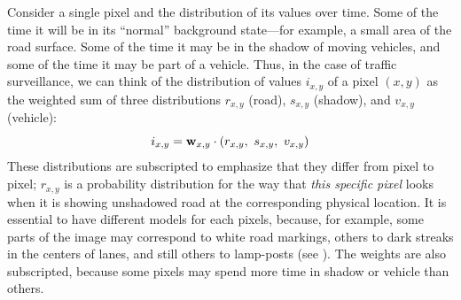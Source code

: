 Consider a single pixel and the distribution of its values over time.
Some of the time it will be in its ``normal'' background state---for
example, a small area of the road surface. Some of the time it may be
in the shadow of moving vehicles, and some of the time it may be part
of a vehicle. Thus, in the case of traffic surveillance, we can think
of the distribution of values $i_{x,y}$ of a pixel $(x,y)$ as the
weighted sum of three distributions $r_{x,y}$ (road), $s_{x,y}$
(shadow), and $v_{x,y}$ (vehicle):
\[ i_{x,y} = \mbox{{\bf w}}_{x,y} \cdot (r_{x,y},\ s_{x,y},\ v_{x,y}) \]
These distributions are subscripted
to emphasize that they differ from pixel to pixel; $r_{x,y}$ is a
probability distribution for the way that {\em this specific pixel}
looks when it is showing unshadowed road at the corresponding physical
location. It is essential to have different models for each pixels,
because, for example, some parts of the image may correspond to white road
markings, others to dark streaks in the centers of lanes, and still
others to lamp-posts (see ).
The weights are also subscripted, because some pixels
may spend more time in shadow or vehicle than others.

